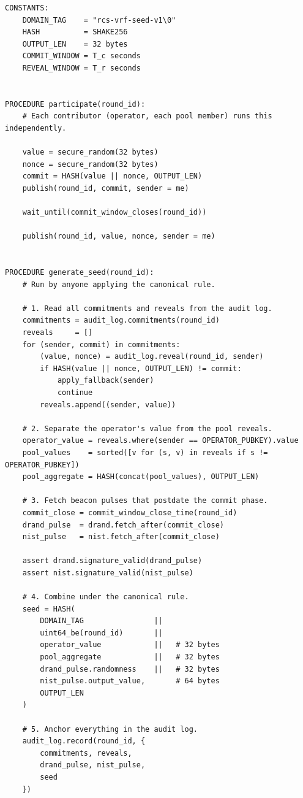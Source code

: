 \documentclass[11pt]{article}
\begin{document}
\begin{lstlisting}
CONSTANTS:
    DOMAIN_TAG    = "rcs-vrf-seed-v1\0"
    HASH          = SHAKE256
    OUTPUT_LEN    = 32 bytes
    COMMIT_WINDOW = T_c seconds
    REVEAL_WINDOW = T_r seconds


PROCEDURE participate(round_id):
    # Each contributor (operator, each pool member) runs this independently.

    value = secure_random(32 bytes)
    nonce = secure_random(32 bytes)
    commit = HASH(value || nonce, OUTPUT_LEN)
    publish(round_id, commit, sender = me)

    wait_until(commit_window_closes(round_id))

    publish(round_id, value, nonce, sender = me)


PROCEDURE generate_seed(round_id):
    # Run by anyone applying the canonical rule.

    # 1. Read all commitments and reveals from the audit log.
    commitments = audit_log.commitments(round_id)
    reveals     = []
    for (sender, commit) in commitments:
        (value, nonce) = audit_log.reveal(round_id, sender)
        if HASH(value || nonce, OUTPUT_LEN) != commit:
            apply_fallback(sender)
            continue
        reveals.append((sender, value))

    # 2. Separate the operator's value from the pool reveals.
    operator_value = reveals.where(sender == OPERATOR_PUBKEY).value
    pool_values    = sorted([v for (s, v) in reveals if s != OPERATOR_PUBKEY])
    pool_aggregate = HASH(concat(pool_values), OUTPUT_LEN)

    # 3. Fetch beacon pulses that postdate the commit phase.
    commit_close = commit_window_close_time(round_id)
    drand_pulse  = drand.fetch_after(commit_close)
    nist_pulse   = nist.fetch_after(commit_close)

    assert drand.signature_valid(drand_pulse)
    assert nist.signature_valid(nist_pulse)

    # 4. Combine under the canonical rule.
    seed = HASH(
        DOMAIN_TAG                ||
        uint64_be(round_id)       ||
        operator_value            ||   # 32 bytes
        pool_aggregate            ||   # 32 bytes
        drand_pulse.randomness    ||   # 32 bytes
        nist_pulse.output_value,       # 64 bytes
        OUTPUT_LEN
    )

    # 5. Anchor everything in the audit log.
    audit_log.record(round_id, {
        commitments, reveals,
        drand_pulse, nist_pulse,
        seed
    })


\end{lstlisting}
\end{document}
